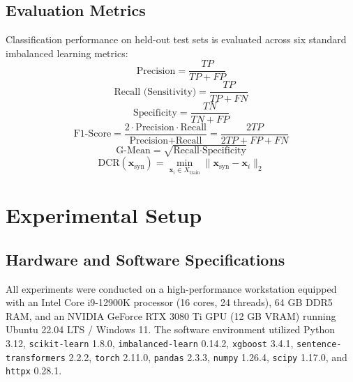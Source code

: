 \documentclass[sn-basic]{sn-jnl}
\begin{document}
\subsection{Evaluation Metrics}
\label{subsec:metrics}
Classification performance on held-out test sets is evaluated across six standard imbalanced learning metrics:
\begin{equation}
\label{eq:precision}
\text{Precision} = \frac{TP}{TP + FP}
\end{equation}
\begin{equation}
\label{eq:recall}
\text{Recall (Sensitivity)} = \frac{TP}{TP + FN}
\end{equation}
\begin{equation}
\label{eq:specificity}
\text{Specificity} = \frac{TN}{TN + FP}
\end{equation}
\begin{equation}
\label{eq:f1}
\text{F1-Score} = \frac{2 \cdot \text{Precision} \cdot \text{Recall}}{\text{Precision} + \text{Recall}} = \frac{2TP}{2TP + FP + FN}
\end{equation}
\begin{equation}
\label{eq:gmean}
\text{G-Mean} = \sqrt{\text{Recall} \cdot \text{Specificity}}
\end{equation}
\begin{equation}
\label{eq:dcr}
\text{DCR}(\mathbf{x}_{\text{syn}}) = \min_{\mathbf{x}_i \in X_{\text{train}}} \|\mathbf{x}_{\text{syn}} - \mathbf{x}_i\|_2
\end{equation}

\section{Experimental Setup}
\label{sec:experimental_setup}

\subsection{Hardware and Software Specifications}
All experiments were conducted on a high-performance workstation equipped with an Intel Core i9-12900K processor (16 cores, 24 threads), 64 GB DDR5 RAM, and an NVIDIA GeForce RTX 3080 Ti GPU (12 GB VRAM) running Ubuntu 22.04 LTS / Windows 11. The software environment utilized Python 3.12, \texttt{scikit-learn} 1.8.0, \texttt{imbalanced-learn} 0.14.2, \texttt{xgboost} 3.4.1, \texttt{sentence-transformers} 2.2.2, \texttt{torch} 2.11.0, \texttt{pandas} 2.3.3, \texttt{numpy} 1.26.4, \texttt{scipy} 1.17.0, and \texttt{httpx} 0.28.1.
\end{document}
